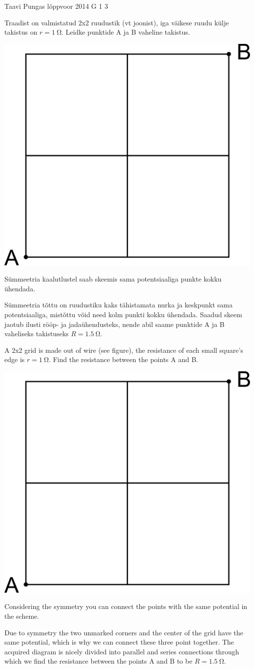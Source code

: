 {Taavi Pungas} %
{lõppvoor} %
{2014} %
{G 1} %
{3} %
{
\ifStatement
Traadist on valmistatud 2x2 ruudustik (vt joonist), iga väikese ruudu külje takistus on $r=\SI{1}{\ohm}$. Leidke punktide A ja B vaheline takistus.

\begin{center}
\includegraphics[width=0.2\linewidth]{2014-v3g-01-ruudustik}
\end{center}
\fi


\ifHint
Sümmeetria kaalutlustel saab skeemis sama potentsiaaliga punkte kokku ühendada.
\fi


\ifSolution
Sümmeetria tõttu on ruudustiku kaks tähistamata nurka ja keskpunkt sama potentsiaaliga, mistõttu võid need kolm punkti kokku ühendada. Saadud skeem jaotub ilusti rööp- ja jadaühendusteks, nende abil saame punktide A ja B vaheliseks takistuseks $R=\SI{1,5}{\ohm}$.
\fi


\ifEngStatement
A 2x2 grid is made out of wire (see figure), the resistance of each small square’s edge is $r=\SI{1}{\ohm}$. Find the resistance between the points A and B. 
\begin{center}
\includegraphics[width=0.2\linewidth]{2014-v3g-01-ruudustik}
\end{center}
\fi


\ifEngHint
Considering the symmetry you can connect the points with the same potential in the scheme.
\fi


\ifEngSolution
Due to symmetry the two unmarked corners and the center of the grid have the same potential, which is why we can connect these three point together. The acquired diagram is nicely divided into parallel and series connections through which we find the resistance between the points A and B to be $R=\SI{1,5}{\ohm}$.
\fi
}